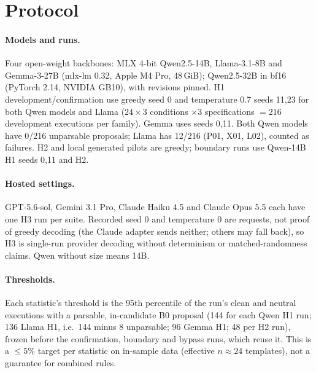 \documentclass[letterpaper]{article} %
\begin{document}
\section{Protocol}
\label{sec:protocol}

\paragraph{Models and runs.}
Four open-weight backbones: MLX 4-bit Qwen2.5-14B, Llama-3.1-8B and Gemma-3-27B (mlx-lm 0.32, Apple M4 Pro, 48\,GiB); Qwen2.5-32B in bf16 (PyTorch 2.14, NVIDIA GB10), with revisions pinned. H1 development/confirmation use greedy seed 0 and temperature 0.7 seeds 11,23 for both Qwen models and Llama ($24\times3$ conditions $\times3$ specifications $=216$ development executions per family). Gemma uses seeds 0,11. Both Qwen models have 0/216 unparsable proposals; Llama has 12/216 (P01, X01, L02), counted as failures. H2 and local generated pilots are greedy; boundary runs use Qwen-14B H1 seeds 0,11 and H2.

\paragraph{Hosted settings.}
GPT-5.6-sol, Gemini 3.1 Pro, Claude Haiku 4.5 and Claude Opus 5.5 each have one H3 run per suite. Recorded seed 0 and temperature 0 are requests, not proof of greedy decoding (the Claude adapter sends neither; others may fall back), so H3 is single-run provider decoding without determinism or matched-randomness claims. Qwen without size means 14B.

\paragraph{Thresholds.} Each statistic's threshold is the 95th percentile of the run's clean and neutral executions with a parsable, in-candidate B0 proposal (144 for each Qwen H1 run; 136 Llama H1, i.e.\ 144 minus 8 unparsable; 96 Gemma H1; 48 per H2 run), frozen before the confirmation, boundary and bypass runs, which reuse it. This is a ${\le}5\%$ target per statistic on in-sample data (effective $n\approx24$ templates), not a guarantee for combined rules.
\end{document}
